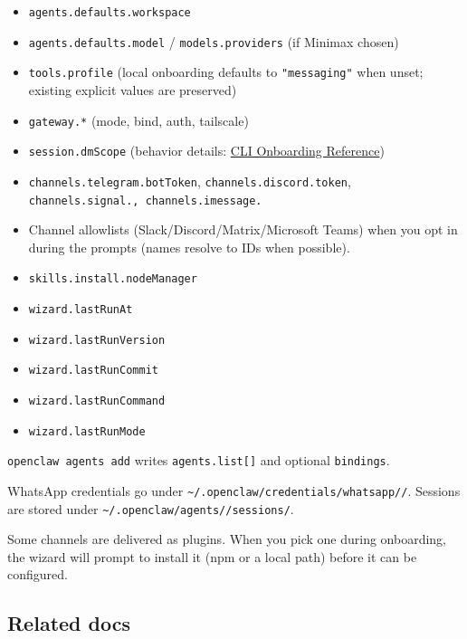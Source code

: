 \begin{itemize}
  \item \texttt{agents.defaults.workspace}
  \item \texttt{agents.defaults.model} / \texttt{models.providers} (if Minimax chosen)
  \item \texttt{tools.profile} (local onboarding defaults to \texttt{"messaging"} when unset; existing explicit values are preserved)
  \item \texttt{gateway.*} (mode, bind, auth, tailscale)
  \item \texttt{session.dmScope} (behavior details: \href{/start/wizard-cli-reference\#outputs-and-internals}{CLI Onboarding Reference})
  \item \texttt{channels.telegram.botToken}, \texttt{channels.discord.token}, \texttt{channels.signal.\textit{}, \texttt{channels.imessage.}}
  \item Channel allowlists (Slack/Discord/Matrix/Microsoft Teams) when you opt in during the prompts (names resolve to IDs when possible).
  \item \texttt{skills.install.nodeManager}
  \item \texttt{wizard.lastRunAt}
  \item \texttt{wizard.lastRunVersion}
  \item \texttt{wizard.lastRunCommit}
  \item \texttt{wizard.lastRunCommand}
  \item \texttt{wizard.lastRunMode}
\end{itemize}


\texttt{openclaw agents add} writes \texttt{agents.list[]} and optional \texttt{bindings}.

WhatsApp credentials go under \texttt{\textasciitilde{}/.openclaw/credentials/whatsapp//}.
Sessions are stored under \texttt{\textasciitilde{}/.openclaw/agents//sessions/}.

Some channels are delivered as plugins. When you pick one during onboarding, the wizard
will prompt to install it (npm or a local path) before it can be configured.

\subsection{Related docs}


